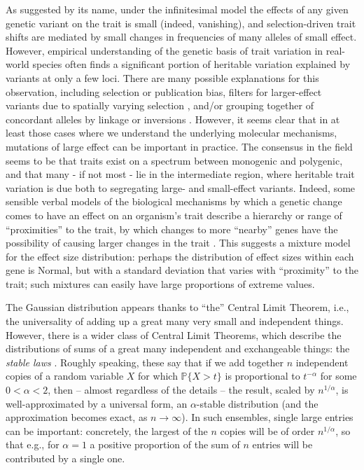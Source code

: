 \documentclass{article}
\renewcommand{\P}{\mathbb{P}}
\newcommand{\1}{\mathbbm{1}}
\theoremstyle{remark}
\theoremstyle{definition}
\begin{document}
As suggested by its name,
under the infinitesimal model the effects of any given genetic variant on the trait
is small (indeed, vanishing),
and selection-driven trait shifts are mediated by small changes in frequencies of many alleles of small effect.
However, empirical understanding of the genetic basis of trait variation in real-world species
often finds a significant portion of heritable variation explained by variants at only a few loci.
There are many possible explanations for this observation,
including selection or publication bias,
filters for larger-effect variants due to spatially varying selection
\citep{barton1987establishment,yeaman2011establishment,yeaman2011genetic},
and/or grouping together of concordant alleles by linkage or inversions
\citep{kirkpatrick2006chromosome}.
However,
it seems clear that in at least those cases where we understand the underlying molecular mechanisms,
mutations of large effect can be important in practice.
The consensus in the field seems to be that traits exist on a spectrum between monogenic and polygenic,
and that many - if not most - lie in the intermediate region,
where heritable trait variation is due both to segregating large- and small-effect variants.
Indeed, some sensible verbal models of the biological mechanisms by which a genetic change
comes to have an effect on an organism's trait
describe a hierarchy or range of ``proximities'' to the trait,
by which changes to more ``nearby'' genes have the possibility of causing larger changes in the trait
\citep{kopp2012transcriptional,boyle2017expanded}.
This suggests a mixture model for the effect size distribution:
perhaps the distribution of effect sizes within each gene is Normal,
but with a standard deviation that varies with ``proximity'' to the trait;
such mixtures can easily have large proportions of extreme values.

The Gaussian distribution appears thanks to ``the'' Central Limit Theorem,
i.e., the universality of adding up a great many very small and independent things.
However, there is a wider class of Central Limit Theorems,
which describe the distributions of sums of a great many independent and exchangeable things:
the \emph{stable laws} \citep{gnedenko1968limit}.
Roughly speaking, these say that if we add together $n$ independent copies of a random variable $X$
for which $\P\{ X > t \}$ is proportional to $t^{-\alpha}$ for some $0 < \alpha < 2$,
then -- almost regardless of the details -- the result, scaled by $n^{1/\alpha}$,
is well-approximated by a universal form, an $\alpha$-stable distribution
(and the approximation becomes exact, as $n \to \infty$).
In such ensembles, single large entries can be important:
concretely, the largest of the $n$ copies will be of order $n^{1/\alpha}$,
so that e.g., for $\alpha=1$ a positive proportion of the sum of $n$ entries will be contributed by a single one.
\end{document}
